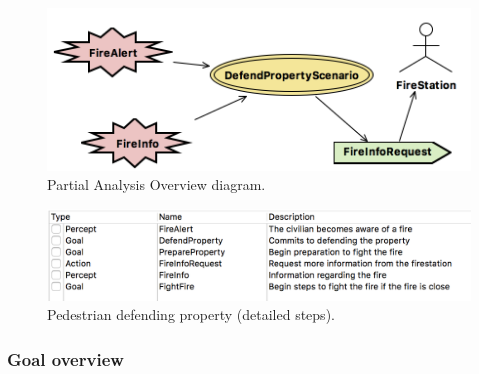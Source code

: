 \documentclass[12pt, a4paper]{memoir} %
\begin{document}
				\begin{figure}
					\begin{center}
						\includegraphics[scale=0.4]{AnalysisOverview.png}
						\caption{\label{fig:analysis-overview}Partial Analysis Overview diagram.}
					\end{center}
				\end{figure}

				\begin{figure}
					\begin{center}
						\includegraphics[scale=0.4]{Scenario.png}
						\caption{\label{fig:scenario}Pedestrian defending property (detailed steps).}
					\end{center}
				\end{figure}

			\subsubsection{Goal overview}
\end{document}

